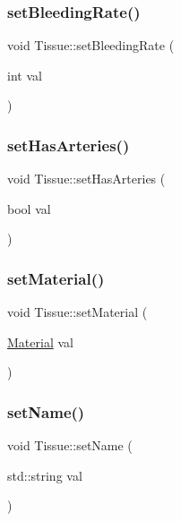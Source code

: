 \mbox{\label{class_tissue_aeeea87a0b266ab1690457fe3b6b8d673}} 
\subsubsection{\texorpdfstring{set\+Bleeding\+Rate()}{setBleedingRate()}}
{\footnotesize\ttfamily void Tissue\+::set\+Bleeding\+Rate (\begin{DoxyParamCaption}\item[{int}]{val }\end{DoxyParamCaption})}

\mbox{\label{class_tissue_aa15728a4d8edba81f92980697e575f69}} 
\subsubsection{\texorpdfstring{set\+Has\+Arteries()}{setHasArteries()}}
{\footnotesize\ttfamily void Tissue\+::set\+Has\+Arteries (\begin{DoxyParamCaption}\item[{bool}]{val }\end{DoxyParamCaption})}

\mbox{\label{class_tissue_a822541fae1ec254c2e370f5cd8c922cd}} 
\subsubsection{\texorpdfstring{set\+Material()}{setMaterial()}}
{\footnotesize\ttfamily void Tissue\+::set\+Material (\begin{DoxyParamCaption}\item[{\mbox{\hyperlink{class_material}{Material}}}]{val }\end{DoxyParamCaption})}

\mbox{\label{class_tissue_a51042a2da532a76d25f389158c2c1f8e}} 
\subsubsection{\texorpdfstring{set\+Name()}{setName()}}
{\footnotesize\ttfamily void Tissue\+::set\+Name (\begin{DoxyParamCaption}\item[{std\+::string}]{val }\end{DoxyParamCaption})}


